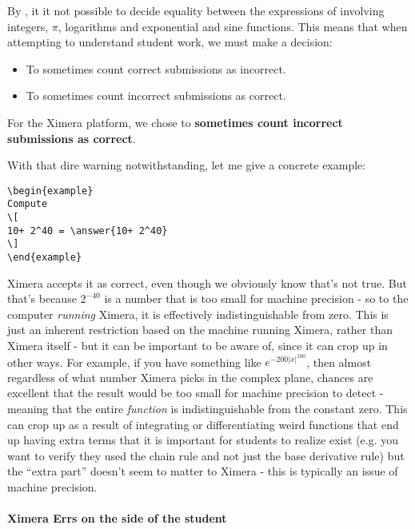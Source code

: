 \documentclass{ximera}
\begin{document}
\begin{warning}
  By , it it not
  possible to decide equality between the expressions of involving integers,
  $\pi$, logarithms and exponential and sine functions.
  This means that when attempting to understand student work, we must make a
  decision:
  \begin{itemize}
    \item To sometimes count correct submissions as incorrect.
    \item To sometimes count incorrect submissions as correct.
  \end{itemize}
  For the Ximera platform, we chose to \textbf{sometimes count incorrect
    submissions as correct}.
\end{warning}
With that dire warning notwithstanding, let me give a concrete example:
\begin{verbatim}
\begin{example}
Compute
\[
10+ 2^40 = \answer{10+ 2^40}
\]
\end{example}
\end{verbatim}

Ximera accepts it as correct, even though we obviously know that's not
true. But that's because $2^{-40}$ is a number that is too small for machine
precision - so to the computer \textit{running} Ximera, it is effectively
indistinguishable from zero. This is just an inherent restriction based on the
machine running Ximera, rather than Ximera itself - but it can be important to
be aware of, since it can crop up in other ways. For example, if you have
something like $e^{-200|x|^{100}}$, then almost regardless of what number
Ximera picks in the complex plane, chances are excellent that the result would
be too small for machine precision to detect - meaning that the entire
\textit{function} is indistinguishable from the constant zero. This can crop up
as a result of integrating or differentiating weird functions that end up
having extra terms that it is important for students to realize exist (e.g. you
want to verify they used the chain rule and not just the base derivative rule)
but the ``extra part'' doesn't seem to matter to Ximera - this is typically an
issue of machine precision.

\paragraph{Ximera Errs on the side of the student}
\end{document}
